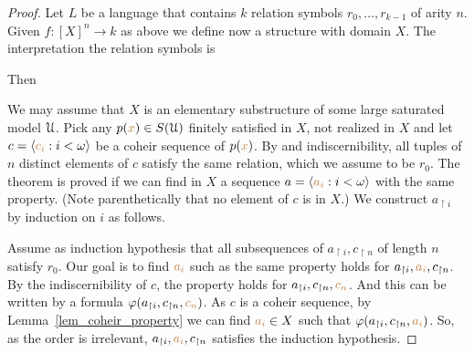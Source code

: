 \documentclass[creche.tex]{subfiles}
\begin{document}
\begin{proof}
Let $L$ be a language that contains $k$ relation symbols $r_0,\dots,r_{k-1}$ of arity $n$. Given $f:[X]^n\to k$ as above we define now a structure with domain $X$. The interpretation the relation symbols is




Then



We may assume that $X$ is an elementary substructure of some large saturated model $\EuScript U$. Pick any $p({\color{brown} x})\in S(\EuScript U)$ finitely satisfied in $X$, not realized in $X$ and let $c=\langle{\color{brown}c_i}:i<\omega\rangle$ be a coheir sequence of $p({\color{brown} x})$. By \ssf{\#} and indiscernibility, all tuples of $n$ distinct elements of $c$ satisfy the same relation, which we assume to be $r_0$. The theorem is proved if we can find in $X$ a sequence $a=\langle{\color{brown}a_i}:i<\omega\rangle$ with the same property. (Note parenthetically that no element of $c$ is in $X$.) We construct $a_{\restriction i}$ by induction on $i$ as follows. 

Assume as induction hypothesis that all subsequences of $a_{\restriction i},c_{\restriction n}$ of length $n$  
satisfy $r_0$. Our goal is to find ${\color{brown}{a_i}}$ such as the same property holds for $a_{\restriction i},{\color{brown}{a_i}},c_{\restriction n}$. By the indiscernibility of $c$, the property holds for  $a_{\restriction i},c_{\restriction n},{\color{brown}{c_n}}$.  And this can be written by a formula $\varphi(a_{\restriction i},c_{\restriction n},{\color{brown}{c_n}})$. As $c$ is a coheir sequence, by Lemma~\ref{lem_coheir_property} we can find  ${\color{brown}{a_i}}\in X$ such that  $\varphi(a_{\restriction i},c_{\restriction n},{\color{brown}{a_i}})$. So, as the order is irrelevant,  $a_{\restriction i},{\color{brown}{a_i}},c_{\restriction n}$ satisfies the induction hypothesis.
\end{proof}
\end{document}
